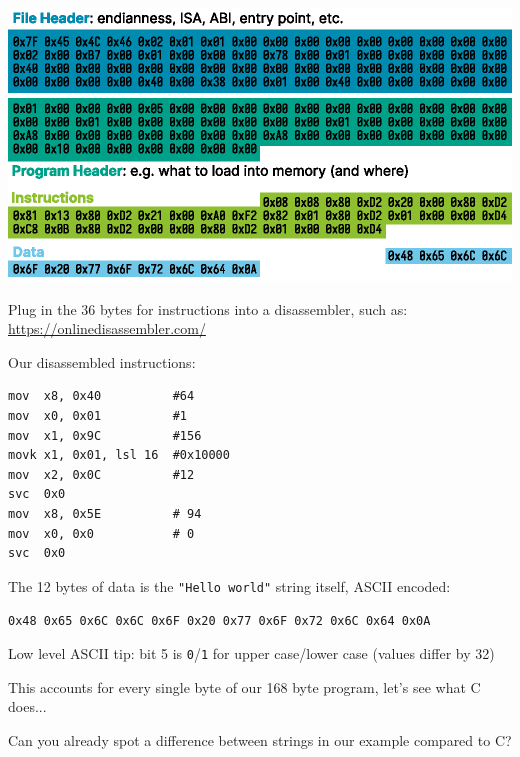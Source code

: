 \begin{slide}
  

  \includegraphics{hello-world-elf.eps}

\end{slide}

\begin{slide}
  

  Plug in the 36 bytes for instructions into a disassembler, such as:
  \url{https://onlinedisassembler.com/}
  \bigskip

  Our disassembled instructions:
  \begin{verbatim}
mov  x8, 0x40          #64
mov  x0, 0x01          #1
mov  x1, 0x9C          #156
movk x1, 0x01, lsl 16  #0x10000
mov  x2, 0x0C          #12
svc  0x0
mov  x8, 0x5E          # 94
mov  x0, 0x0           # 0
svc  0x0
  \end{verbatim}
\end{slide}

\begin{slide}
  

  The 12 bytes of data is the \texttt{"Hello world"} string itself, ASCII
  encoded:

  \leftspace{}\texttt{\small 0x48 0x65 0x6C 0x6C 0x6F 0x20 0x77 0x6F 0x72 0x6C 0x64
                        0x0A}
  \medskip

  Low level ASCII tip: bit 5 is \texttt{0}/\texttt{1} for upper
  case/lower case (values differ by 32)
  \bigskip

  This accounts for every single byte of our 168 byte program, let's see what
  C does...
  \bigskip

  Can you already spot a difference between strings in our example compared to
  C?
\end{slide}

